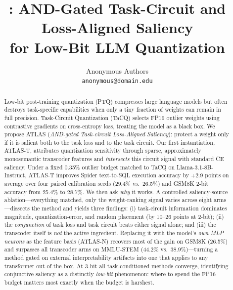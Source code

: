 \documentclass{article}
\title{\family{}: AND-Gated Task-Circuit and Loss-Aligned Saliency\\
for Low-Bit LLM Quantization}
\author{Anonymous Authors\\
\texttt{anonymous@domain.edu}}
\newcommand{\family}{ATLAS}
\newcommand{\method}{ATLAS-T}     %
\newcommand{\methodfree}{ATLAS-N} %
\newcommand{\baseline}{TaCQ}
\begin{document}
\maketitle

\begin{abstract}
Low-bit post-training quantization (PTQ) compresses large language models but
often destroys task-specific capabilities when only a tiny fraction of weights
can remain in full precision. Task-Circuit Quantization (\baseline{}) selects
FP16 outlier weights using contrastive gradients on cross-entropy loss,
treating the model as a black box. We propose \family{} (\emph{AND-gated
Task-circuit Loss-Aligned Saliency}): protect a weight only if it is salient
both to the task loss and to the task circuit. Our first instantiation,
\method{}, attributes quantization sensitivity through sparse, approximately
monosemantic transcoder features and \emph{intersects} this circuit signal
with standard CE saliency. Under a fixed
0.35\% outlier budget matched to \baseline{} on Llama-3.1-8B-Instruct,
\method{} improves Spider text-to-SQL execution accuracy by +2.9 points on
average over four paired calibration seeds (29.4\% vs.\ 26.5\%) and GSM8K
2-bit accuracy from 25.4\% to 28.7\%. We then ask \emph{why} it works. A
controlled saliency-source ablation---everything matched, only the
weight-ranking signal varies across eight arms---dissects the method and
yields three findings: (i) task-circuit information dominates magnitude,
quantization-error, and random placement (by 10--26 points at 2-bit); (ii) the
\emph{conjunction} of task loss and task circuit beats either signal alone;
and (iii) the transcoder itself is \emph{not} the active ingredient. Replacing
it with the model's \emph{own MLP neurons} as the feature basis
(\methodfree{}) recovers most of the gain on GSM8K (26.5\%) and surpasses all
transcoder arms on MMLU-STEM (44.2\% vs.\ 38.9\%)---turning a method gated on
external interpretability artifacts into one that applies to any transformer
out-of-the-box. At 3-bit all task-conditioned methods converge, identifying
conjunctive saliency as a distinctly \emph{low-bit} phenomenon: where to spend
the FP16 budget matters most exactly when the budget is harshest.
\end{abstract}

















\appendix

\end{document}
